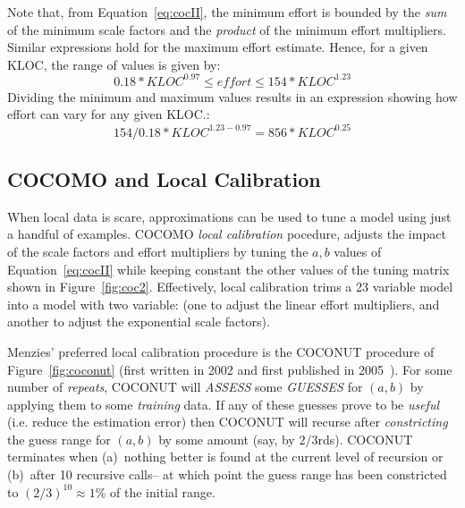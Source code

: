 \documentclass{sig-alternate}
\newcommand{\fig}[1]{Figure~\ref{fig:#1}}
\newcommand{\eq}[1]{Equation~\ref{eq:#1}}
\begin{document}
Note that, from \eq{cocII},
the minimum  
effort  is bounded by the  {\em sum} of the minimum scale factors
and the {\em product} of the minimum effort multipliers.
Similar expressions hold for the  maximum effort estimate. Hence,
for a given KLOC, the range of values is given by:
\[
0.18*\mathit{KLOC}^{0.97}  \le \mathit{effort} \le 154*\mathit{KLOC}^{1.23}\]
Dividing the minimum and maximum values results in an  expression showing
how    effort can vary for any given KLOC.: 
\begin{equation}\label{eq:ration}
154/0.18 *\mathit{KLOC}^{1.23 - 0.97} = 856*\mathit{KLOC}^{0.25}
\end{equation}
 



 
\subsection{COCOMO and Local Calibration}\label{sect:coconut}
When local data is scare, approximations can be used to
tune a model using just a handful of examples.  
 COCOMO   {\em local calibration} pocedure, adjusts the impact of the scale factors and effort
multipliers by tuning the  $a,b$ values of Equation~\ref{eq:cocII}
while keeping constant the other values of the tuning matrix
shown in \fig{coc2}. Effectively, local calibration trims
a 23 variable model
into a model with two variable: (one  to adjust the linear effort
multipliers, and another to adjust the exponential scale factors).

Menzies' preferred local calibration procedure is the COCONUT
procedure of \fig{coconut} (first written in 2002
and first published in 2005~\cite{me04h}). 
For some number of {\em repeats},
COCONUT will {\em ASSESS} some {\em GUESSES} 
 for $(a,b)$ by applying them to some
{\em training} data. If any of these guesses prove to
be {\em useful} (i.e. reduce the estimation error) then COCONUT will recurse after
{\em constricting} the guess range for $(a,b)$ by some amount (say, by $2/3$rds). COCONUT terminates
when (a)~nothing better is found at the current level of recursion
or (b)~after 10 recursive calls-- at which point the guess range
has been constricted to  $(2/3)^{10}\approx 1$\% of the initial range.
\end{document}
